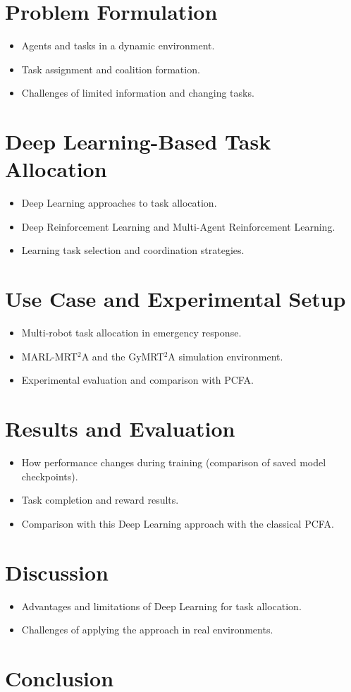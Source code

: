 \documentclass[conference]{IEEEtran}
\begin{document}
\section{Problem Formulation}
\begin{itemize}
    \item Agents and tasks in a dynamic environment.
    \item Task assignment and coalition formation.
    \item Challenges of limited information and changing tasks.
\end{itemize}

\section{Deep Learning-Based Task Allocation}
\begin{itemize}
    \item Deep Learning approaches to task allocation.
    \item Deep Reinforcement Learning and Multi-Agent Reinforcement Learning.
    \item Learning task selection and coordination strategies.
\end{itemize}

\section{Use Case and Experimental Setup}
\begin{itemize}
    \item Multi-robot task allocation in emergency response.
    \item MARL-MRT$^2$A and the GyMRT$^2$A simulation environment.
    \item Experimental evaluation and comparison with PCFA.
\end{itemize}

\section{Results and Evaluation}
\begin{itemize}
    \item How performance changes during training (comparison of saved model checkpoints).
    \item Task completion and reward results.
    \item Comparison with this Deep Learning approach with the classical PCFA.
\end{itemize}

\section{Discussion}
\begin{itemize}
    \item Advantages and limitations of Deep Learning for task allocation.
    \item Challenges of applying the approach in real environments.
\end{itemize}

\section{Conclusion}



\end{document}
